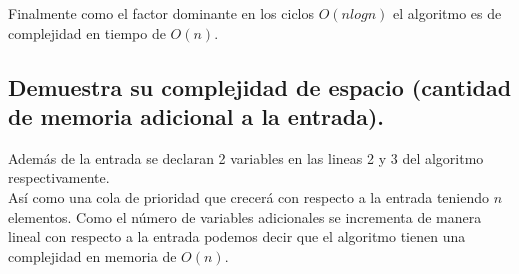 \documentclass[12pt]{article}
\begin{document}
 Finalmente como el factor dominante en los ciclos $O(nlogn)$ el algoritmo es de complejidad en tiempo de $O(n)$.
 \subsection{Demuestra su complejidad de espacio (cantidad de memoria adicional a la entrada).}
 Además de la entrada se declaran 2 variables en las lineas 2 y 3 del algoritmo respectivamente.\\
 Así como una cola de prioridad que crecerá con respecto a la entrada teniendo $n$ elementos.
 Como el número de variables adicionales se incrementa de manera lineal con respecto a la entrada podemos decir que el algoritmo tienen una complejidad en memoria de $O(n)$.
\end{document}
